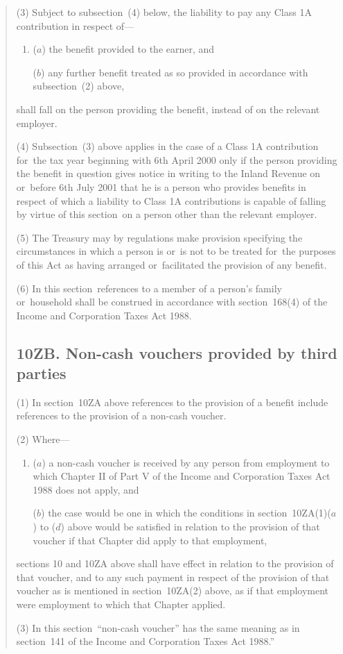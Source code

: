 \documentclass[12pt,a4paper]{article}
\begin{document}
\begin{quotation}
(3) Subject to subsection~(4)  below, the liability to pay any Class 1A contribution in respect of—
\begin{enumerate}\item[]
($a$) the benefit provided to the earner, and

($b$) any further benefit treated as so provided in accordance with subsection~(2)  above,
\end{enumerate}
shall fall on the person providing the benefit, instead of on the relevant employer.

(4) Subsection~(3)  above applies in the case of a Class 1A contribution for~the tax year beginning with 6th April 2000 only if the person providing the benefit in question gives notice in writing to the Inland Revenue on or~before 6th July 2001 that he is a person who provides benefits in respect of which a liability to Class 1A contributions is capable of falling by virtue of this section~on a person other than the relevant employer.

(5) The Treasury may by regulations make provision specifying the circumstances in which a person is or~is not to be treated for~the purposes of this Act as having arranged or~facilitated the provision of any benefit.

(6) In this section~references to a member of a person’s family or~household shall be construed in accordance with section~168(4)  of the Income and Corporation Taxes Act 1988. 

\subsection*{10ZB. Non-cash vouchers provided by third parties}

(1) In section~10ZA above references to the provision of a benefit include references to the provision of a non-cash voucher.

(2) Where—
\begin{enumerate}\item[]
($a$) a non-cash voucher is received by any person from employment to which Chapter II of Part V of the Income and Corporation Taxes Act 1988 does not apply, and

($b$) the case would be one in which the conditions in section~10ZA(1)($a$)  to ($d$)  above would be satisfied in relation to the provision of that voucher if that Chapter did apply to that employment,
\end{enumerate}
sections 10 and 10ZA above shall have effect in relation to the provision of that voucher, and to any such payment in respect of the provision of that voucher as is mentioned in section~10ZA(2)  above, as if that employment were employment to which that Chapter applied.

(3) In this section~“non-cash voucher” has the same meaning as in section~141 of the Income and Corporation Taxes Act 1988.”
\end{quotation}
\end{document}
